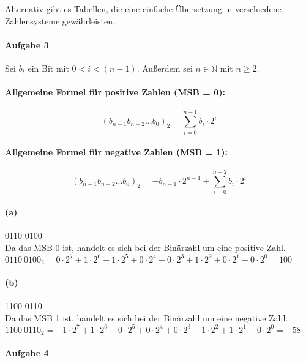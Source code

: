 \documentclass[12pt, letterpaper]{article}
\begin{document}
\noindent Alternativ gibt es Tabellen, die eine einfache Übersetzung in verschiedene Zahlensysteme gewährleisten.

\paragraph{Aufgabe 3}

\noindent Sei $b_i$ ein Bit mit $0 < i < (n - 1)$. Außerdem sei $n \in \mathbb{N}$ mit $n \geq 2$. 

\paragraph{Allgemeine Formel für positive Zahlen (MSB = 0):}
\[
(b_{n-1}b_{n-2}\dots b_0)_2 = \sum_{i=0}^{n-1} b_i \cdot 2^i
\]

\paragraph{Allgemeine Formel für negative Zahlen (MSB = 1):}
\[
(b_{n-1}b_{n-2}\dots b_0)_2 = -b_{n-1} \cdot 2^{n-1} + \sum_{i=0}^{n-2} b_i \cdot 2^i
\]

\paragraph{(a)}

0110 0100\\

\noindent Da das MSB 0 ist, handelt es sich bei der Binärzahl um eine positive Zahl.\\

\noindent $0110\ 0100_2 = 0 \cdot 2^7 + 1 \cdot 2^6 + 1 \cdot 2^5 + 0 \cdot 2^4 + 0 \cdot 2^3 + 1 \cdot 2^2 + 0 \cdot 2^1 + 0 \cdot 2^0 = 100$ 

\paragraph{(b)}

1100 0110\\

\noindent Da das MSB 1 ist, handelt es sich bei der Binärzahl um eine negative Zahl.\\

\noindent $1100\ 0110_2 = -1 \cdot 2^7 + 1 \cdot 2^6 + 0 \cdot 2^5 + 0 \cdot 2^4 + 0 \cdot 2^3 + 1 \cdot 2^2 + 1 \cdot 2^1 + 0 \cdot 2^0 = -58$

\paragraph{Aufgabe 4}
\end{document}
